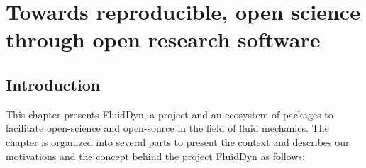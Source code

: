 \chapter{Towards reproducible, open science through open research software}
\section{Introduction}



%


This chapter presents FluidDyn, a project and an ecosystem of packages to
facilitate open-science and open-source in the field of fluid mechanics.  The
chapter is organized into several parts to present the context and describes
our motivations and the concept behind the project FluidDyn as follows:

